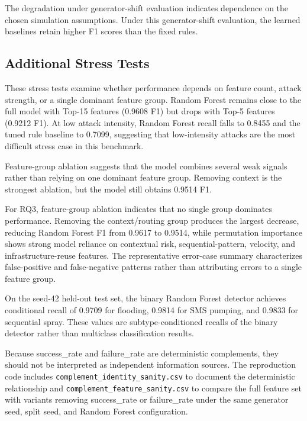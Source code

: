 \documentclass[conference]{IEEEtran}
\begin{document}
The degradation under generator-shift evaluation indicates dependence on the chosen simulation assumptions. Under this generator-shift evaluation, the learned baselines retain higher F1 scores than the fixed rules.

\subsection{Additional Stress Tests}

These stress tests examine whether performance depends on feature count, attack strength, or a single dominant feature group. Random Forest remains close to the full model with Top-15 features (0.9608 F1) but drops with Top-5 features (0.9212 F1). At low attack intensity, Random Forest recall falls to 0.8455 and the tuned rule baseline to 0.7099, suggesting that low-intensity attacks are the most difficult stress case in this benchmark.

Feature-group ablation suggests that the model combines several weak signals rather than relying on one dominant feature group. Removing context is the strongest ablation, but the model still obtains 0.9514 F1.

For RQ3, feature-group ablation indicates that no single group dominates performance. Removing the context/routing group produces the largest decrease, reducing Random Forest F1 from 0.9617 to 0.9514, while permutation importance shows strong model reliance on contextual risk, sequential-pattern, velocity, and infrastructure-reuse features. The representative error-case summary characterizes false-positive and false-negative patterns rather than attributing errors to a single feature group.

On the seed-42 held-out test set, the binary Random Forest detector achieves conditional recall of 0.9709 for flooding, 0.9814 for SMS pumping, and 0.9833 for sequential spray. These values are subtype-conditioned recalls of the binary detector rather than multiclass classification results.

Because success\_rate and failure\_rate are deterministic complements, they should not be interpreted as independent information sources. The reproduction code includes \texttt{complement\_identity\_sanity.csv} to document the deterministic relationship and \texttt{complement\_feature\_sanity.csv} to compare the full feature set with variants removing success\_rate or failure\_rate under the same generator seed, split seed, and Random Forest configuration.
\end{document}
